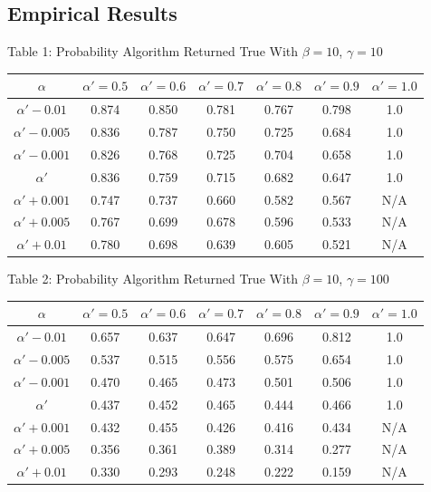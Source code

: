 \documentclass{article}
\begin{document}
\subsection{Empirical Results}
\begin{center}
Table 1: Probability Algorithm Returned True With $\beta=10$, $\gamma=10$ \\
\begin{tabular}{|c|c|c|c|c|c|c|}
\hline
$\alpha$ & $\alpha' = 0.5$ & $\alpha' = 0.6$ & $\alpha' = 0.7$ & $\alpha' = 0.8$ & $\alpha' = 0.9$ & $\alpha' = 1.0$ \\
\hline
$\alpha' -0.01$ & 0.874 & 0.850 & 0.781 & 0.767 & 0.798 & 1.0 \\
\hline
$\alpha'-0.005$ & 0.836 & 0.787 & 0.750 & 0.725 & 0.684 & 1.0 \\
\hline
$\alpha'-0.001$ & 0.826 & 0.768 & 0.725 & 0.704 & 0.658 & 1.0 \\
\hline
$\alpha'$            & 0.836 & 0.759 & 0.715 & 0.682 & 0.647 & 1.0 \\
\hline
$\alpha'+0.001$ & 0.747 & 0.737 & 0.660 & 0.582 & 0.567 & N/A \\
\hline
$\alpha'+0.005$ & 0.767 & 0.699 & 0.678 & 0.596 & 0.533 & N/A \\
\hline
$\alpha'+0.01 $ & 0.780 & 0.698 & 0.639 & 0.605 & 0.521 & N/A \\
\hline
\end{tabular}
\end{center}

\begin{center}
Table 2: Probability Algorithm Returned True With $\beta=10$, $\gamma=100$ \\
\begin{tabular}{|c|c|c|c|c|c|c|}
\hline
$\alpha$ & $\alpha' = 0.5$ & $\alpha' = 0.6$ & $\alpha' = 0.7$ & $\alpha' = 0.8$ & $\alpha' = 0.9$ & $\alpha' = 1.0$ \\
\hline
$\alpha' -0.01$ & 0.657 & 0.637 & 0.647 & 0.696 & 0.812 & 1.0 \\
\hline
$\alpha'-0.005$ & 0.537 & 0.515 & 0.556 & 0.575 & 0.654 & 1.0 \\
\hline
$\alpha'-0.001$ & 0.470 & 0.465 & 0.473 & 0.501 & 0.506 & 1.0 \\
\hline
$\alpha'$         & 0.437 & 0.452 & 0.465 & 0.444 & 0.466 & 1.0 \\
\hline
$\alpha'+0.001$ & 0.432 & 0.455 & 0.426 & 0.416 & 0.434 & N/A \\
\hline
$\alpha'+0.005$ & 0.356 & 0.361 & 0.389 & 0.314 & 0.277 & N/A \\
\hline
$\alpha'+0.01 $ & 0.330 & 0.293 & 0.248 & 0.222 & 0.159 & N/A \\
\hline
\end{tabular}
\end{center}
\end{document}
